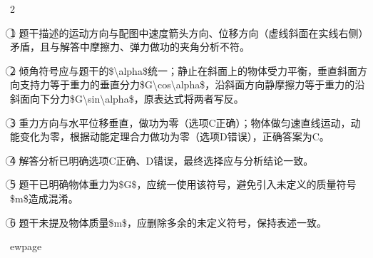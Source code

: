 \documentclass[12pt,a4paper]{ctexart}
\newlength{\colwidthinner}
\newcommand{\calccolwidth}{%
  \setlength{\colwidthinner}{\dimexpr\linewidth-2\fboxsep-2\fboxrule\relax}%
}
\newcommand{\correctionbox}[1]{%
  \calccolwidth
  \colorbox{blue!8}{\parbox{\colwidthinner}{#1}}%
}
\begin{document}
\begin{paracol}{2}
\switchcolumn

\correctionbox{\textcircled{1} 题干描述的运动方向与配图中速度箭头方向、位移方向（虚线斜面在实线右侧）矛盾，且与解答中摩擦力、弹力做功的夹角分析不符。}
\medskip

\correctionbox{\textcircled{2} 倾角符号应与题干的\$\textbackslash alpha\$统一；静止在斜面上的物体受力平衡，垂直斜面方向支持力等于重力的垂直分力\$G\textbackslash cos\textbackslash alpha\$，沿斜面方向静摩擦力等于重力的沿斜面向下分力\$G\textbackslash sin\textbackslash alpha\$，原表达式将两者写反。}
\medskip

\correctionbox{\textcircled{3} 重力方向与水平位移垂直，做功为零（选项C正确）；物体做匀速直线运动，动能变化为零，根据动能定理合力做功为零（选项D错误），正确答案为C。}
\medskip

\correctionbox{\textcircled{4} 解答分析已明确选项C正确、D错误，最终选择应与分析结论一致。}
\medskip

\correctionbox{\textcircled{5} 题干已明确物体重力为\$G\$，应统一使用该符号，避免引入未定义的质量符号\$m\$造成混淆。}
\medskip

\correctionbox{\textcircled{6} 题干未提及物体质量\$m\$，应删除多余的未定义符号，保持表述一致。}
\medskip

\switchcolumn*

\end{paracol}


ewpage
\end{document}
